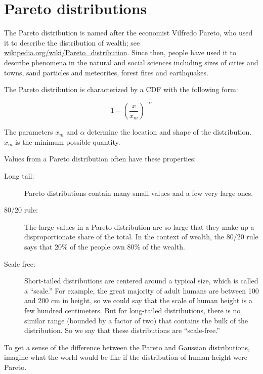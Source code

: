 \documentclass[10pt]{book}
\begin{document}
\section{Pareto distributions}

The Pareto distribution is named after the economist Vilfredo
Pareto, who used it to describe the distribution of wealth;
see \url{wikipedia.org/wiki/Pareto_distribution}.  Since then,
people have used it to describe
phenomena in the natural and social sciences
including sizes of cities and towns, sand particles
and meteorites, forest fires and earthquakes.

The Pareto distribution is characterized by a CDF with the following
form:

\[ 1- \left( \frac{x}{x_m} \right) ^{-\alpha} \]

The parameters $x_m$ and $\alpha$ determine the location and shape of
the distribution.  $x_m$ is the minimum possible quantity.

Values from a Pareto distribution often have these properties:

\begin{description}

\item[Long tail:] Pareto distributions contain many small values
and a few very large ones.

\item[80/20 rule:] The large values in a Pareto distribution are
so large that they make up a disproportionate share of the total.
In the context of wealth, the 80/20 rule says that 20\% of the
people own 80\% of the wealth.

\item[Scale free:] Short-tailed distributions are centered around
a typical size, which is called a ``scale.''  For example, the
great majority of adult humans are between 100 and 200 cm in height,
so we could say that the scale of human height is a few hundred
centimeters.  But for long-tailed distributions, there is no
similar range (bounded by a factor of two) that contains the
bulk of the distribution.  So we say that these distributions
are ``scale-free.''

\end{description}

To get a sense of the difference between the Pareto and Gaussian
distributions, imagine what the world would be like if the
distribution of human height were Pareto.
\end{document}
